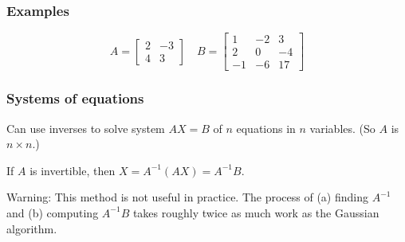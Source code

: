 \documentclass[11pt,t]{beamer}
\begin{document}
\begin{frame}\frametitle{Examples}
\[
A = \begin{bmatrix}2&-3\\4&3\end{bmatrix} \quad B = \begin{bmatrix}1 & -2 & 3\\2 & 0 & -4\\-1&-6&17\end{bmatrix}
\]

\end{frame}
\begin{frame}\frametitle{Systems of equations}
Can use inverses to solve system $AX=B$ of $n$ equations in $n$ variables. (So $A$ is $n\times n$.)

If $A$ is invertible, then $X = A^{-1}(AX) = A^{-1}B$.

\vspace{1in}

\alert{Warning}: This method is not useful in practice. The process of (a) finding $A^{-1}$ and (b) computing $A^{-1}B$ takes roughly twice as much work as the Gaussian algorithm.
\end{frame}
\end{document}

